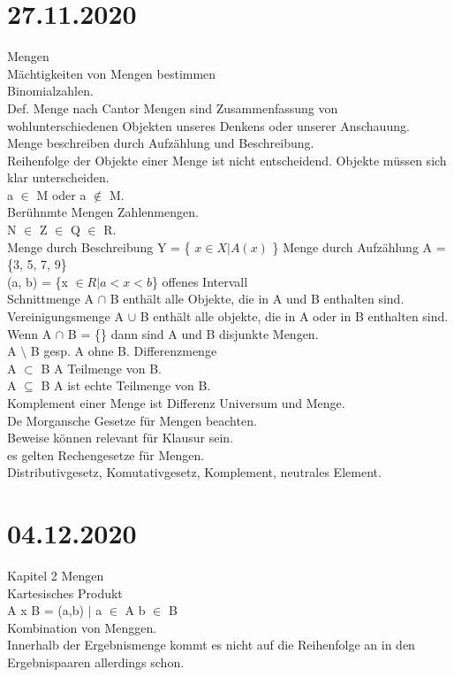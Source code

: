 \documentclass{article}
\begin{document}
	\section*{27.11.2020}
	Mengen \\
	Mächtigkeiten von Mengen bestimmen \\
	Binomialzahlen. \\
	Def. Menge nach Cantor Mengen sind Zusammenfassung von wohlunterschiedenen Objekten unseres Denkens oder unserer Anschauung. \\
	Menge beschreiben durch Aufzählung und Beschreibung. \\
	Reihenfolge der Objekte einer Menge ist nicht entscheidend. Objekte müssen sich klar unterscheiden. \\
	a $\in$ M oder a $\notin$ M. \\
	Berühnmte Mengen Zahlenmengen. \\
	N $\in$ Z $\in$ Q $\in$ R. \\
	Menge durch Beschreibung Y = \{ $x \in X | A(x)$ \}
	Menge durch Aufzählung A = \{3, 5, 7, 9\} \\
	(a, b) = \{x $\in R | a < x < b$\} offenes Intervall \\
	Schnittmenge A $\cap$ B enthält alle Objekte, die in A und B enthalten sind. \\
	Vereinigungsmenge A $\cup$ B enthält alle objekte, die in A oder in B enthalten sind. \\
	Wenn A $\cap$ B = \{\} dann sind A und B disjunkte Mengen. \\
	A $\setminus$ B gesp. A ohne B. Differenzmenge \\
	A $\subset$ B A Teilmenge von B. \\
	A $\subseteq$ B A ist echte Teilmenge von B. \\
	Komplement einer Menge ist Differenz Universum und Menge. \\
	De Morgansche Gesetze für Mengen beachten. \\
	Beweise können relevant für Klausur sein. \\
	es gelten Rechengesetze für Mengen. \\
	Distributivgesetz, Komutativgesetz, Komplement, neutrales Element. \\
	\section*{04.12.2020}
	Kapitel 2 Mengen \\
	Kartesisches Produkt \\
	A x B = {(a,b) $|$ a $\in$ A b $\in$ B} \\
	Kombination von Menggen. \\
	Innerhalb der Ergebnismenge kommt es nicht auf die Reihenfolge an in den Ergebnispaaren allerdings schon. \\
	
\end{document}
